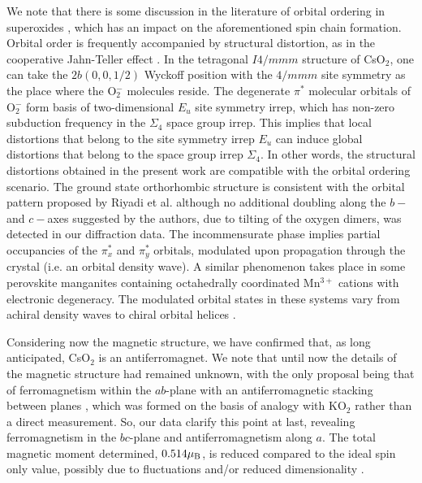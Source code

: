 \documentclass[prb,aps,twocolumn,superscriptaddress,showpacs,footinbib]{revtex4-2}
\newcommand{\cso}{CsO$_{2}$ }
\begin{document}
We note that there is some discussion in the literature of orbital ordering in superoxides \cite{Klanjsek2015,Knaflic2015,Nandy2010,Kim2010,Kim2014}, which has an impact on the aforementioned spin chain formation. Orbital order is frequently accompanied by structural distortion, as in the cooperative Jahn-Teller effect \cite{Kanamori-coopJT-1960}. In the tetragonal $I4/mmm$ structure of CsO$_2$, one can take the $2b(0,0,1/2)$ Wyckoff position with the $4/mmm$ site symmetry as the place where the O$_{2}^{-}$ molecules reside. The degenerate $\pi^*$ molecular orbitals of O$_{2}^{-}$ form basis of two-dimensional $E_u$ site symmetry irrep, which has non-zero subduction frequency in the $\Sigma_4$ space group irrep. This implies that local distortions that belong to the site symmetry irrep $E_u$ can induce global distortions that belong to the space group irrep $\Sigma_4$. In other words, the structural distortions obtained in the present work are compatible with the orbital ordering scenario. The ground state orthorhombic structure is consistent with the orbital pattern proposed by Riyadi et al. \cite{Riyadi2012} although no additional doubling along the $b-$ and $c-$axes suggested by the authors, due to tilting of the oxygen dimers, was detected in our diffraction data. The incommensurate phase implies partial occupancies of the $\pi_x^*$ and $\pi_y^*$ orbitals, modulated upon propagation through the crystal (i.e. an orbital density wave). A similar phenomenon takes place in some perovskite manganites containing octahedrally coordinated Mn$^{3+}$ cations with electronic degeneracy. The modulated orbital states in these systems vary from achiral density waves \cite{Perks2012} to chiral orbital helices \cite{Khalyavin2020}.

Considering now the magnetic structure, we have confirmed that, as long anticipated, \cso is an antiferromagnet. We note that until now the details of the magnetic structure had remained unknown, with the only proposal being that of ferromagnetism within the $ab$-plane with an antiferromagnetic stacking between planes \cite{Labhart}, which was formed on the basis of analogy with KO$_{2}$ \cite{Smith1966} rather than a direct measurement. So, our data clarify this point at last, revealing ferromagnetism in the $bc$-plane and antiferromagnetism along $a$. The total magnetic moment determined, $0.514\mu_{\rm{B}}$, is reduced compared to the ideal spin only value, possibly due to fluctuations and/or reduced dimensionality \cite{Klanjsek2015}.
\end{document}
